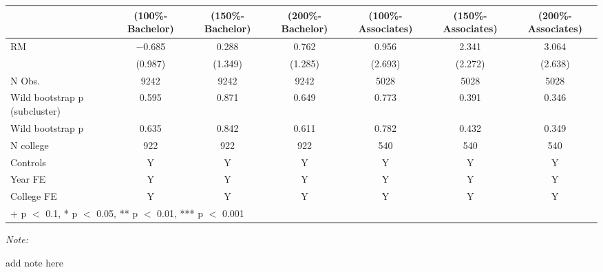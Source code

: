\begin{table}
\centering
\begin{threeparttable}
\begin{tabular}[t]{lcccccc}
\toprule
  & (100\%-Bachelor) & (150\%-Bachelor) & (200\%-Bachelor) & (100\%-Associates) & (150\%-Associates) & (200\%-Associates)\\
\midrule
RM & \num{-0.685} & \num{0.288} & \num{0.762} & \num{0.956} & \num{2.341} & \num{3.064}\\
 & (\num{0.987}) & (\num{1.349}) & (\num{1.285}) & (\num{2.693}) & (\num{2.272}) & (\num{2.638})\\
\midrule
N Obs. & \num{9242} & \num{9242} & \num{9242} & \num{5028} & \num{5028} & \num{5028}\\
Wild bootstrap p (subcluster) & 0.595 & 0.871 & 0.649 & 0.773 & 0.391 & 0.346\\
Wild bootstrap p & 0.635 & 0.842 & 0.611 & 0.782 & 0.432 & 0.349\\
N college & 922 & 922 & 922 & 540 & 540 & 540\\
Controls & Y & Y & Y & Y & Y & Y\\
Year FE & Y & Y & Y & Y & Y & Y\\
College FE & Y & Y & Y & Y & Y & Y\\
\bottomrule
\multicolumn{7}{l}{\rule{0pt}{1em}+ p $<$ 0.1, * p $<$ 0.05, ** p $<$ 0.01, *** p $<$ 0.001}\\
\end{tabular}
\begin{tablenotes}
\item \textit{Note: } 
\item add note here
\end{tablenotes}
\end{threeparttable}
\end{table}
